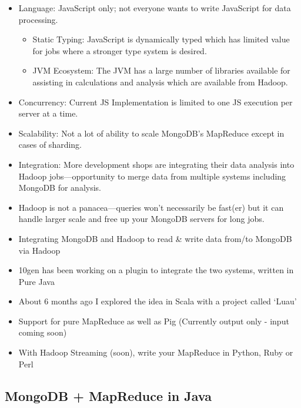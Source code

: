 \documentclass[xcolor=dvipsnames]{beamer}
\newenvironment{itemizeframe}
               {\begin{frame}\startitemizeframe} 
               {\stopitemizeframe\end{frame}}
\newcommand\startitemizeframe{\begin{itemize}} \newcommand\stopitemizeframe{\end{itemize}}
\begin{document}
\begin{itemizeframe}
    \frametitle{Why Integrate MongoDB?}
        \item<2-> Language: JavaScript only; not everyone wants to write JavaScript for data processing.
            \begin{itemize}
                \item<3->Static Typing: JavaScript is dynamically typed which has limited value for jobs where a stronger type system is desired.
                \item<3->JVM Ecosystem: The JVM has a large number of libraries available for assisting in calculations and analysis which are available from Hadoop.
            \end{itemize}
        \item<4-> Concurrency: Current JS Implementation is limited to one JS execution per server at a time.
        \item<5-> Scalability: Not a lot of ability to scale MongoDB's MapReduce except in cases of sharding.
        \item<6-> Integration: More development shops are integrating their data analysis into Hadoop jobs---opportunity to merge data from multiple systems including MongoDB for analysis.
    \item<7->Hadoop is not a panacea---queries won't necessarily be fast(er) but it can handle larger scale and free up your MongoDB servers for long jobs.
\end{itemizeframe}

\begin{itemizeframe}
    \frametitle{Mongo + Hadoop \ldots}
    \item Integrating MongoDB and Hadoop to read \& write data from/to MongoDB via Hadoop
    \item 10gen has been working on a plugin to integrate the two systems, written in Pure Java
    \item About 6 months ago I explored the idea in Scala with a project called `Luau'
    \item Support for pure MapReduce as well as Pig (Currently output only - input coming soon)
    \item With Hadoop Streaming (soon), write your MapReduce in Python, Ruby or Perl
\end{itemizeframe}

\subsection[The Code\ldots Revealed]{MongoDB + MapReduce in Java}
\end{document}
